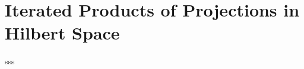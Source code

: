 \chapter{Iterated Products of Projections in Hilbert Space}\label{chapt:Iterated_Products_of_Projections_in_Hilbert_Space}
sss
